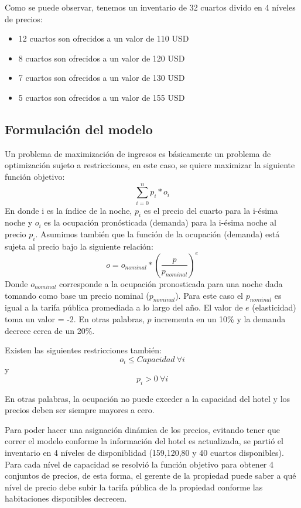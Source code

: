 Como se puede observar, tenemos un inventario de 32 cuartos divido en 4 níveles de precios:
\begin{itemize}[noitemsep]
\item 12 cuartos son ofrecidos a un valor de 110 USD
\item 8 cuartos son ofrecidos a un valor de 120 USD
\item 7 cuartos son ofrecidos a un valor de 130 USD
\item 5 cuartos son ofrecidos a un valor de 155 USD
\end{itemize}

\subsection*{Formulación del modelo}

Un problema de maximización de ingresos es básicamente un problema de optimización sujeto a restricciones, en este caso, se quiere maximizar la siguiente función objetivo:
$$\sum_{i=0}^{n}p_i*o_i$$
En donde i es la índice de la noche, $p_i$ es el precio del cuarto para la i-ésima noche y $o_i$ es la ocupación pronósticada (demanda) para la i-ésima noche al precio $p_i$. Asumimos también que la función de la ocupación (demanda) está sujeta al precio bajo la siguiente relación:
$$o = o_{nominal} * (\frac{p}{p_{nominal}})^e$$
Donde $o_{nominal}$ corresponde a la ocupación pronosticada para una noche dada tomando como base un precio nominal ($p_{nominal}$). Para este caso el $p_{nominal}$ es igual a la tarifa pública promediada a lo largo del año. El valor de $e$ (elasticidad) toma un valor = -2. En otras palabras, $p$ incrementa en un 10\% y la demanda decrece cerca de un 20\%.

Existen las siguientes restricciones también: $$o_i \leq Capacidad\ \forall i$$ y $$p_i > 0\ \forall i$$

En otras palabras, la ocupación no puede exceder a la capacidad del hotel y los precios deben ser siempre mayores a cero.

Para poder hacer una asignación dinámica de los precios, evitando tener que correr el modelo conforme la información del hotel es actualizada, se partió el inventario en 4 níveles de disponiblidad (159,120,80 y 40 cuartos disponibles). Para cada nível de capacidad se resolvió la función objetivo para obtener 4 conjuntos de precios, de esta forma, el gerente de la propiedad puede saber a qué nível de precio debe subir la tarifa pública de la propiedad conforme las habitaciones disponibles decrecen.

